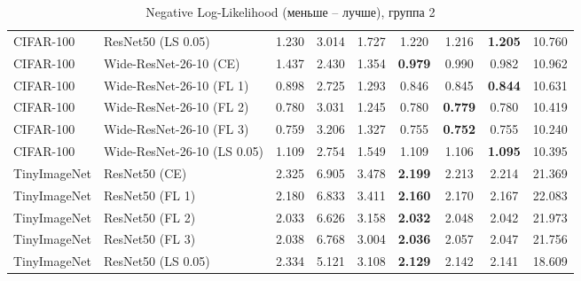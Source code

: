 \begin{table}[h!]
{\begin{tabular}{llccccccc}
   CIFAR-100 &          ResNet50 (LS 0.05) &         1.230 &        3.014 &    1.727 &                  1.220 &                  1.216 & \textbf{1.205} &                 10.760 \\
   CIFAR-100 &      Wide-ResNet-26-10 (CE) &         1.437 &        2.430 &    1.354 & \textbf{0.979} &                  0.990 &                  0.982 &                 10.962 \\
   CIFAR-100 &    Wide-ResNet-26-10 (FL 1) &         0.898 &        2.725 &    1.293 &                  0.846 &                  0.845 & \textbf{0.844} &                 10.631 \\
   CIFAR-100 &    Wide-ResNet-26-10 (FL 2) &         0.780 &        3.031 &    1.245 &                  0.780 & \textbf{0.779} &                  0.780 &                 10.419 \\
   CIFAR-100 &    Wide-ResNet-26-10 (FL 3) &         0.759 &        3.206 &    1.327 &                  0.755 & \textbf{0.752} &                  0.755 &                 10.240 \\
   CIFAR-100 & Wide-ResNet-26-10 (LS 0.05) &         1.109 &        2.754 &    1.549 &                  1.109 &                  1.106 & \textbf{1.095} &                 10.395 \\
TinyImageNet &               ResNet50 (CE) &         2.325 &        6.905 &    3.478 & \textbf{2.199} &                  2.213 &                  2.214 &                 21.369 \\
TinyImageNet &             ResNet50 (FL 1) &         2.180 &        6.833 &    3.411 & \textbf{2.160} &                  2.170 &                  2.167 &                 22.083 \\
TinyImageNet &             ResNet50 (FL 2) &         2.033 &        6.626 &    3.158 & \textbf{2.032} &                  2.048 &                  2.042 &                 21.973 \\
TinyImageNet &             ResNet50 (FL 3) &         2.038 &        6.768 &    3.004 & \textbf{2.036} &                  2.057 &                  2.047 &                 21.756 \\
TinyImageNet &          ResNet50 (LS 0.05) &         2.334 &        5.121 &    3.108 & \textbf{2.129} &                  2.142 &                  2.141 &                 18.609 \\
\bottomrule
\end{tabular}%
}
\caption{Negative Log-Likelihood (меньше -- лучше), группа 2}
\label{tab:metrics:NLL_2}
\end{table}
